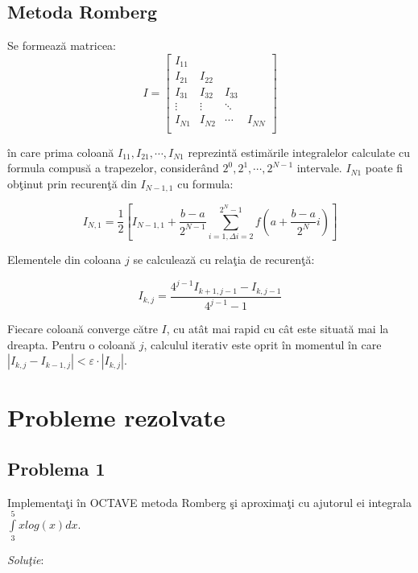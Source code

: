 \documentclass{exam}
\newcommand{\octavescript}[2]{
	
}
\begin{document}
\subsection{Metoda Romberg}

Se formeaz\u{a} matricea:
$$ I=\begin{bmatrix}
		I_{11} &        &                 \\
		I_{21} & I_{22} &                 \\
		I_{31} & I_{32} & I_{33}          \\
		\vdots & \vdots & \ddots &        \\
		I_{N1} & I_{N2} & \cdots & I_{NN} \\
	\end{bmatrix} $$

\noindent \^{i}n care prima coloan\u{a} $ I_{11}, I_{21}, \cdots, I_{N1} $ reprezint\u{a} estim\u{a}rile integralelor calculate cu formula compus\u{a} a trapezelor, consider\^{a}nd
$ 2^0, 2^1, \cdots, 2^{N - 1} $ intervale. $ I_{N1} $ poate fi ob\c{t}inut prin recuren\c{t}\u{a} din $ I_{N - 1, 1} $ cu formula:

$$ I_{N, 1} = \frac{1}{2} \left[ I_{N - 1, 1} + \frac{b - a}{2^{N - 1}} \sum_{i = 1, \Delta i = 2}^{2^N - 1} f\left(a + \frac{b - a}{2^N}i \right) \right] $$

Elementele din coloana $j$ se calculeaz\u{a} cu rela\c{t}ia de recuren\c{t}\u{a}:

$$ I_{k, j} = \frac{4^{j - 1}I_{k + 1, j - 1} - I_{k, j - 1}}{4^{j - 1} - 1} $$

Fiecare coloan\u{a} converge c\u{a}tre $I$, cu at\^{a}t mai rapid cu c\^{a}t este situat\u{a} mai la dreapta. Pentru o coloan\u{a} $j$, calculul iterativ este oprit \^{i}n momentul \^{i}n care $ \left| I_{k, j} - I_{k - 1, j} \right| < \varepsilon \cdot \left| I_{k, j} \right| $.

\section{Probleme rezolvate}

\subsection{Problema 1}
Implementa\c{t}i \^{i}n OCTAVE metoda Romberg \c{s}i aproxima\c{t}i cu ajutorul ei integrala $\int\limits_{3}^{5}xlog(x)dx.$

\textit{Solu\c{t}ie}:
\octavescript{./src/romberg.m}{Metoda de integrare Romberg.}
\octavescript{./src/lab12Pr1.m}{lab12Pr1.m.}
\end{document}
